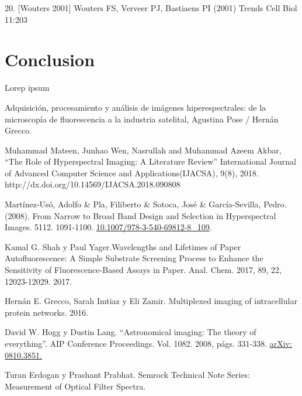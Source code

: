 \documentclass{ctuthesis}
\begin{document}
20. [Wouters 2001] Wouters FS, Verveer PJ, Bastiaens PI (2001) Trends Cell Biol 11:203
\chapter{Conclusion}

Lorep ipsum \cite{doe}


\renewcommand\bibname{Referencias Bibliográficas}
\begin{thebibliography}{1}

 Adquisición, procesamiento y análisis de imágenes 
hiperespectrales: de la microscopía de fluorescencia a la industria satelital, 
Agustina Pose / Hernán Grecco. 

 Muhammad Mateen, Junhao Wen, Nasrullah and Muhammad Azeem 
Akbar, “The Role of Hyperspectral Imaging: A Literature Review” International 
Journal of Advanced Computer Science and Applications(IJACSA), 9(8), 2018. 
http://dx.doi.org/10.14569/IJACSA.2018.090808

 Martínez-Usó, Adolfo \& Pla, Filiberto \& Sotoca, José 
\& 
García-Sevilla, Pedro.(2008). From Narrow to Broad Band Design and Selection 
in Hyperspectral Images. 5112. 1091-1100. 
\href{https://www.researchgate.net/publication/221472272_From_Narrow_to_Broad_Band_Design_and_Selection_in_Hyperspectral_Images}{10.1007/978-3-540-69812-8\_109}.
 
 
 
 Kamal G. Shah y Paul Yager.Wavelengths and Lifetimes of 
Paper Autofluorescence: A Simple Substrate Screening Process to Enhance the 
Sensitivity of Fluorescence-Based Assays in Paper. Anal. Chem. 2017,  89, 22, 
12023-12029. 2017.
 
 Hernán E. Grecco, Sarah Imtiaz y Eli Zamir. Multiplexed
imaging of intracellular protein networks. 2016.

 David W. Hogg y Dustin Lang. “Astronomical imaging: The
	theory of everything”. AIP Conference Proceedings. Vol. 1082.
	2008, págs. 331-338. \href{https://arxiv.org/pdf/0810.3851.pdf}{arXiv: 
	0810.3851.}

 Turan Erdogan y Prashant Prabhat. Semrock Technical Note 
Series: Measurement of 
Optical Filter Spectra. 

\end{thebibliography}
\end{document}

